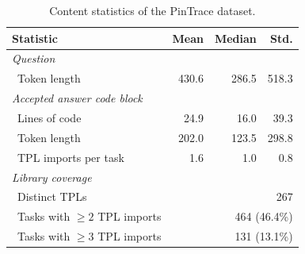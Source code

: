 \begin{table}[t]
\caption{Content statistics of the PinTrace dataset.}
\label{tab:dataset_content}
\begin{tabular}{lrrr}
\toprule
Statistic & Mean & Median & Std. \\
\midrule
\multicolumn{4}{l}{\textit{Question}} \\
\ Token length             & 430.6 & 286.5 & 518.3 \\
\midrule
\multicolumn{4}{l}{\textit{Accepted answer code block}} \\
\ Lines of code            & 24.9 & 16.0 & 39.3 \\
\ Token length             & 202.0 & 123.5 & 298.8 \\
\ TPL imports per task     & 1.6 & 1.0 & 0.8 \\
\midrule
\multicolumn{4}{l}{\textit{Library coverage}} \\
\ Distinct TPLs            & \multicolumn{3}{r}{267} \\
\ Tasks with $\geq 2$ TPL imports & \multicolumn{3}{r}{464 (46.4\%)} \\
\ Tasks with $\geq 3$ TPL imports & \multicolumn{3}{r}{131 (13.1\%)} \\
\bottomrule
\end{tabular}
\end{table}

